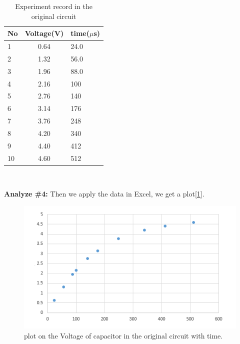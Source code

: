 \begin{table}[htbp]\centering
	\caption{Experiment record in the original circuit}
	\renewcommand\arraystretch{1.5}
	\begin{tabular}{lcl}
		\toprule
		No		&Voltage(V)	&time($\mu$s)	\\
		\midrule
		1		&0.64		&24.0		\\
		
		2		&1.32		&56.0		\\
		
		3		&1.96		&88.0		\\
		
		4		&2.16		&100		\\
		
		5		&2.76		&140		\\
		
		6		&3.14		&176		\\
		
		7		&3.76		&248		\\
		
		8		&4.20		&340		\\
		
		9		&4.40		&412		\\
		
		10		&4.60		&512		\\
		\bottomrule
	\end{tabular}\\
\end{table}
\textbf{Analyze \#4:} \newline
\phantom{ } Then we apply the data in Excel, we get a plot[\ref{fig:2.1}].\\
\begin{figure}[htbp]
	\centering %
	\includegraphics[width=\linewidth]{images/2_1.PNG} %
	\caption{plot on the Voltage of capacitor in the original circuit with time.} %
	\label{fig:2.1} %
\end{figure}
